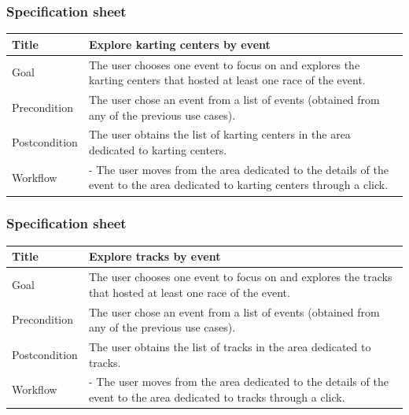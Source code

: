 \documentclass{beamer}
\begin{document}
\begin{frame}
    \frametitle{Specification sheet}
    \begin{table}
        \tiny
        \begin{tabular}{|p{2cm}|p{6cm}|}
        \hline
        Title & \textbf{Explore karting centers by event} \\
        \hline
        Goal & The user chooses one event to focus on and explores the karting centers that hosted at least
        one race of the event. \\
        \hline
        Precondition & The user chose an event from a list of events (obtained from any of the previous use cases).\\
        \hline
        Postcondition & The user obtains the list of karting centers in the area dedicated to karting centers. \\
        \hline
        Workflow &
        - The user moves from the area dedicated to the details of the event to the
        area dedicated to karting centers through a click. \\
        \hline
        \end{tabular}
\end{table}
\end{frame}

\begin{frame}
    \frametitle{Specification sheet}
    \begin{table}
        \tiny
        \begin{tabular}{|p{2cm}|p{6cm}|}
        \hline
        Title & \textbf{Explore tracks by event} \\
        \hline
        Goal & The user chooses one event to focus on and explores the tracks that hosted at least
        one race of the event. \\
        \hline
        Precondition & The user chose an event from a list of events (obtained from any of the previous use cases).\\
        \hline
        Postcondition & The user obtains the list of tracks in the area dedicated to tracks. \\
        \hline
        Workflow &
        - The user moves from the area dedicated to the details of the event to the
        area dedicated to tracks through a click. \\
        \hline
        \end{tabular}
\end{table}
\end{frame}
\end{document}

